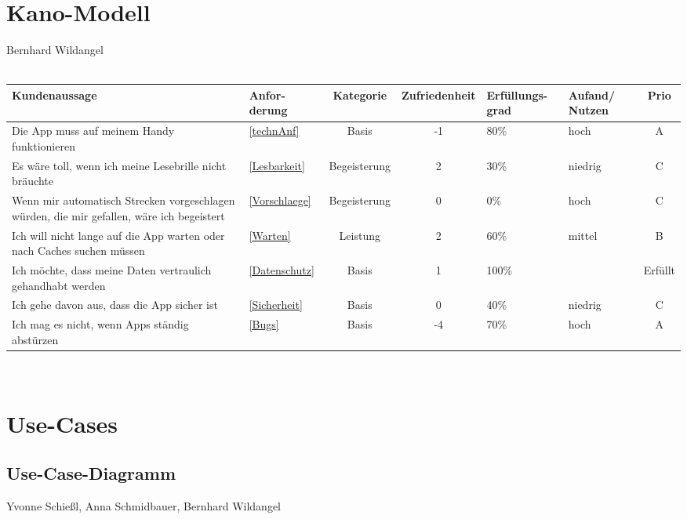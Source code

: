 \documentclass[a4paper, 12pt]{article}
\begin{document}
\newpage
\section{Kano-Modell}Bernhard Wildangel\\\\
\begin{tabular}{ | p{5cm} | p{1.1cm} | c | c | p{1.7cm} | p{1.5cm} | c |}
\hline
Kundenaussage & Anfor-derung & Kategorie & Zufriedenheit & Erfüllungs-grad & Aufand/ Nutzen & Prio \\ \hline
Die App muss auf meinem Handy funktionieren  & \ref{technAnf} & Basis & -1 & 80\% & hoch & A \\ \hline
Es wäre toll, wenn ich meine Lesebrille nicht bräuchte & \ref{Lesbarkeit} & Begeisterung & 2 & 30\% & niedrig & C \\ \hline
Wenn mir automatisch Strecken vorgeschlagen würden, die mir gefallen, wäre ich begeistert & \ref{Vorschlaege} & Begeisterung & 0 & 0\% & hoch & C \\ \hline
Ich will nicht lange auf die App warten oder nach Caches suchen müssen & \ref{Warten} & Leistung & 2 & 60\% & mittel	& B \\ \hline
Ich möchte, dass meine Daten vertraulich gehandhabt werden & \ref{Datenschutz} & Basis & 1 & 100\% & & Erfüllt \\ \hline
Ich gehe davon aus, dass die App sicher ist & \ref{Sicherheit} & Basis & 0 & 40\% & niedrig & C \\ \hline
Ich mag es nicht, wenn Apps ständig abstürzen & \ref{Bugs} & Basis & -4 & 70\% & hoch & A \\ \hline
\end{tabular}\\



\newpage
\section{Use-Cases}
\subsection{Use-Case-Diagramm}Yvonne Schießl, Anna Schmidbauer, Bernhard Wildangel

\begin{figure}[H] 
\centering
\end{figure}
\end{document}
